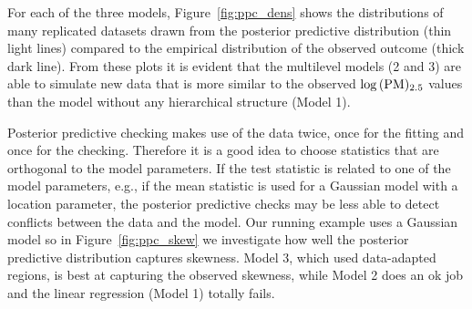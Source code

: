 \documentclass{statsoc}
\begin{document}
For each of the three models, Figure~\ref{fig:ppc_dens} shows the distributions
of many replicated datasets drawn from the posterior predictive distribution
(thin light lines) compared to the empirical distribution of the observed
outcome (thick dark line). From these plots it is evident that the multilevel
models (2 and 3) are able to simulate new data that is more similar to the
observed $\log{(\rm PM)_{2.5}}$ values than the model without any hierarchical
structure (Model 1).

Posterior predictive checking makes use of the data twice, once for the fitting
and once for the checking. Therefore it is a good idea to choose statistics that
are orthogonal to the model parameters. If the test statistic is related to one
of the model parameters, e.g., if the mean statistic is used for a Gaussian
model with a location parameter, the posterior predictive checks may be less
able to detect conflicts between the data and the model.
Our running example uses a Gaussian model so in Figure~\ref{fig:ppc_skew} we
investigate how well the posterior predictive distribution captures skewness.
Model 3, which used data-adapted regions, is best at capturing the observed
skewness, while Model 2 does an ok job and the linear regression (Model 1)
totally fails.
\end{document}
